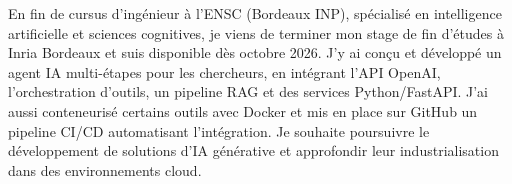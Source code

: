 
\begin{cvparagraph}
En fin de cursus d’ingénieur à l’ENSC (Bordeaux INP), spécialisé en intelligence artificielle et sciences cognitives, je viens de terminer mon stage de fin d’études à Inria Bordeaux et suis disponible dès octobre 2026. J’y ai conçu et développé un agent IA multi-étapes pour les chercheurs, en intégrant l’API OpenAI, l’orchestration d’outils, un pipeline RAG et des services Python/FastAPI. J’ai aussi conteneurisé certains outils avec Docker et mis en place sur GitHub un pipeline CI/CD automatisant l’intégration. Je souhaite poursuivre le développement de solutions d’IA générative et approfondir leur industrialisation dans des environnements cloud.
\end{cvparagraph}
